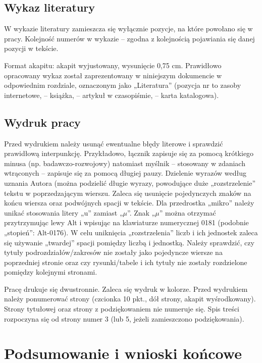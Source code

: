 \documentclass[12pt,twoside]{article}
\begin{document}
\subsection{Wykaz literatury}

W wykazie literatury zamieszcza się wyłącznie pozycje, na które powołano się
w pracy. Kolejność numerów w wykazie – zgodna z kolejnością pojawiania się danej
pozycji w tekście.

Format akapitu: akapit wyjustowany, wysunięcie 0,75 cm. Prawidłowo opracowany
wykaz został zaprezentowany w niniejszym dokumencie w odpowiednim rozdziale, oznaczonym jako „Literatura”  (pozycja nr \cite{str} to zasoby internetowe,
\cite{Jakubczyk1997} – książka, \cite{Barski2011} – artykuł w czasopiśmie, \cite{dokum} – karta katalogowa).

{\subsection{Wydruk pracy}}

Przed wydrukiem należy usunąć ewentualne błędy literowe i sprawdzić prawidłową
interpunkcję. Przykładowo, łącznik zapisuje się za pomocą krótkiego minusa (np.
badawczo-rozwojowy) natomiast myślnik -- stosowany w zdaniach wtrąconych -- zapisuje
się za pomocą długiej pauzy. Dzielenie wyrazów według uznania Autora (można podzielić
długie wyrazy, powodujące duże „rozstrzelenie” tekstu w poprzedzającym wierszu. Zaleca się usunięcie pojedynczych znaków na końcu wiersza oraz podwójnych spacji w tekście.
Dla przedrostka „mikro” należy unikać stosowania litery „u” zamiast „$\mu$”. Znak „$\mu$” można
otrzymać przytrzymując lewy Alt i wpisując na klawiaturze numerycznej 0181 (podobnie
„stopień”: Alt-0176). W celu uniknięcia „rozstrzelenia” liczb i ich jednostek zaleca się
używanie „twardej” spacji pomiędzy liczbą i jednostką. Należy sprawdzić, czy tytuły
podrozdziałów/zakresów nie zostały jako pojedyncze wiersze na poprzedniej stronie oraz
czy rysunki/tabele i ich tytuły nie zostały rozdzielone pomiędzy kolejnymi stronami.

Pracę drukuje się dwustronnie. Zaleca się wydruk w kolorze. Przed wydrukiem
należy ponumerować strony (czcionka 10 pkt., dół strony, akapit wyśrodkowany). Strony
tytułowej oraz strony z podziękowaniem nie numeruje się. Spis treści rozpoczyna się od
strony numer 3 (lub 5, jeżeli zamieszczono podziękowania).

\clearpage

\section{Podsumowanie i wnioski końcowe}
\end{document}
